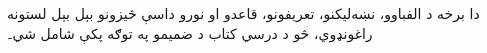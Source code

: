 \documentclass[../../include/open-logic-part]{subfiles}
\begin{document}

\begin{editorial}
  دا برخه د الفباوو، نښه‌ليکنو، تعريفونو، قاعدو او نورو داسې څيزونو بېل بېل لستونه راغونډوي، څو د درسي کتاب د ضميمو په توګه پکې شامل شي۔
\end{editorial}



\OLEndPartHook
\end{document}
